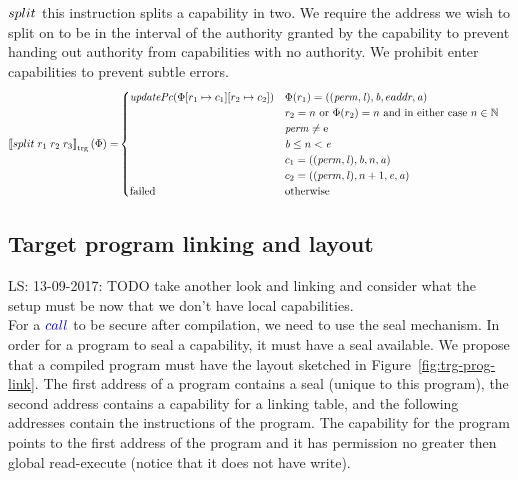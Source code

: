 \documentclass[a4paper]{article}
\newcommand\lau[1]{{\color{purple} \sf \footnotesize {LS: #1}}\\}
\newcommand{\sem}[1]{\left\llbracket #1 \right\rrbracket}
\newcommand{\tsem}[2][\Phi]{\sem{#2}_{\mathrm{trg}}(#1)}
\newcommand{\totherwise}{\text{otherwise }}
\newcommand{\sourcecolor}[1]{\color{blue}}
\newcommand{\src}[1]{{\sourcecolor{} #1}}
\newcommand{\targetcolor}[1]{\color{black}}
\newcommand{\trg}[1]{{\targetcolor{} #1}}
\newcommand{\zinstr}[1]{#1}
\newcommand{\twoinstr}[3]{
  \ifthenelse{\equal{#2#3}{}}
  {\zinstr{#1}}
  {\zinstr{#1} \; #2 \; #3}
}
\newcommand{\threeinstr}[4]{
  \ifthenelse{\equal{#2#3#4}{}}
  {\zinstr{#1}}
  {\zinstr{#1} \; #2 \; #3 \; #4}
}
\newcommand{\scall}[2]{\twoinstr{\src{call}}{#1}{#2}}
\newcommand{\tsplit}[3]{\threeinstr{\trg{split}}{#1}{#2}{#3}}
\newcommand{\nats}{\mathbb{N}}
\newcommand{\update}[2]{[#1 \mapsto #2]}
\newcommand{\perm}{\var{perm}}
\newcommand{\lin}{\var{l}}
\newcommand{\failed}{\mathrm{failed}}
\newcommand{\var}[1]{\mathit{#1}}
\newcommand{\baddr}{\var{b}}
\newcommand{\eaddr}{\var{e}}
\newcommand{\aaddr}{\var{a}}
\newcommand{\plainperm}[1]{\mathrm{#1}}
\newcommand{\enter}{\plainperm{e}}
\newcommand{\plainfun}[2]{
  \ifthenelse{\equal{#2}{}}
  {\mathit{#1}}
  {\mathit{#1}(#2)}
}
\newcommand{\updPcAddr}[1]{\plainfun{updatePc}{#1}}
\begin{document}
$\tsplit{}{}{}$ this instruction splits a capability in two. We require the address we wish to split on to be in the interval of the authority granted by the capability to prevent handing out authority from capabilities with no authority. We prohibit enter capabilities to prevent subtle errors. 
\begin{align*}
  \tsem{\tsplit{r_1}{r_2}{r_3}} = &
                               \begin{cases}
                                 \updPcAddr{\Phi\update{r_1}{c_1}\update{r_2}{c_2}} &
                                 \arraycolsep=0pt
                                 \begin{array}[t]{l}
                                   \Phi(r_1) = ((\perm, \lin), \baddr, eaddr, \aaddr) \\
                                   r_2 = n \text{ or } \Phi(r_2) = n \text{ and in either case } n \in \nats\\
                                   \perm \neq \enter\\
                                   \baddr \leq n  < \eaddr\\
                                   c_1 = ((\perm,\lin),\baddr, n, \aaddr) \\
                                   c_2 = ((\perm,\lin),n + 1, \eaddr,\aaddr)
                                 \end{array} \\
                                 \failed & \totherwise
                               \end{cases}
\end{align*}


\subsection{Target program linking and layout}
\lau{13-09-2017: TODO take another look and linking and consider what the setup must be now that we don't have local capabilities.}
For a $\scall{}{}$ to be secure after compilation, we need to use the seal mechanism. In order for a program to seal a capability, it must have a seal available. We propose that a compiled program must have the layout sketched in Figure~\ref{fig:trg-prog-link}. The first address of a program contains a seal (unique to this program), the second address contains a capability for a linking table, and the following addresses contain the instructions of the program. The capability for the program points to the first address of the program and it has permission no greater then global read-execute (notice that it does not have write).
\end{document}
